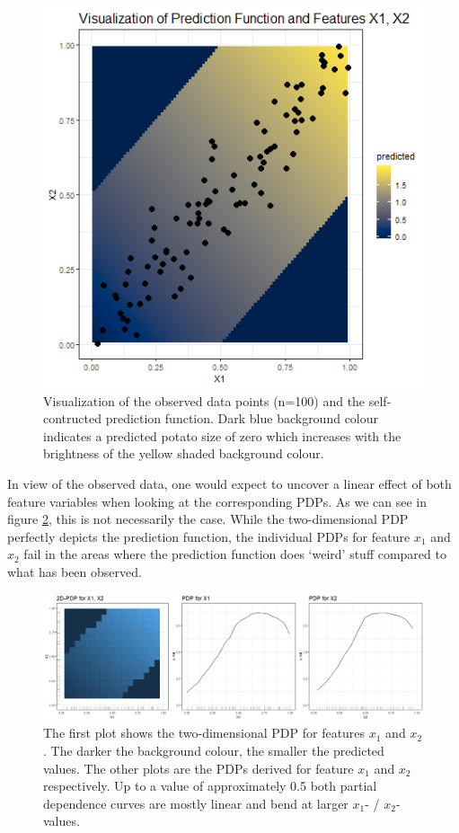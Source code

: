 \documentclass[
]{krantz}
\begin{document}
\begin{figure}

{\centering \includegraphics[width=0.6\linewidth]{images/VK_PDP_27_Prediction_Fct} 

}

\caption{Visualization of the observed data points (n=100) and the self-contructed prediction function. Dark blue background colour indicates a predicted potato size of zero which increases with the brightness of the yellow shaded background colour.}\label{fig:Figure27}
\end{figure}

In view of the observed data, one would expect to uncover a linear effect of both feature variables when looking at the corresponding PDPs. As we can see in figure \ref{fig:Figure28}, this is not necessarily the case. While the two-dimensional PDP perfectly depicts the prediction function, the individual PDPs for feature \(x_1\) and \(x_2\) fail in the areas where the prediction function does `weird' stuff compared to what has been observed.

\begin{figure}

\includegraphics[width=1.1\linewidth]{images/VK_PDP_28_Prediction_Fct_Fail} \hfill{}

\caption{The first plot shows the two-dimensional PDP for features $x_1$ and $x_2$. The darker the background colour, the smaller the predicted values. The other plots are the PDPs derived for feature $x_1$ and $x_2$ respectively. Up to a value of approximately 0.5 both partial dependence curves are mostly linear and bend at larger $x_1$- / $x_2$-values.}\label{fig:Figure28}
\end{figure}
\end{document}
